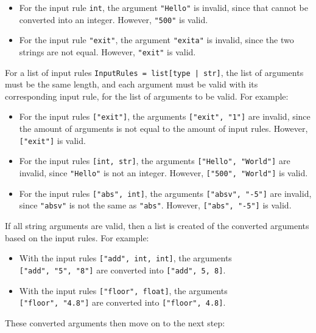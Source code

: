 \documentclass{article}
\begin{document}
				\begin{itemize}
					\item For the input rule \verb|int|, the argument \verb|"Hello"| is invalid,
					since that cannot be converted into an integer. However, \verb|"500"| is
					valid.
					\item For the input rule \verb|"exit"|, the argument \verb|"exita"| is invalid,
					since the two strings are not equal. However, \verb|"exit"| is valid.
				\end{itemize}

				For a list of input rules \verb+InputRules = list[type | str]+, the list of
				arguments must be the same length, and each argument must be valid with its
				corresponding input rule, for the list of arguments to be valid. For example:

				\begin{itemize}
					\item For the input rules \verb|["exit"]|, the arguments \verb|["exit", "1"]| are
					invalid, since the amount of arguments is not equal to the amount of input rules.
					However, \verb|["exit"]| is valid.
					\item For the input rules \verb|[int, str]|, the arguments \verb|["Hello", "World"]|
					are invalid, since \verb|"Hello"| is not an integer. However, \verb|["500", "World"]|
					is valid.
					\item For the input rules \verb|["abs", int]|, the arguments \verb|["absv", "-5"]|
					are invalid, since \verb|"absv"| is not the same as \verb|"abs"|. However,
					\verb|["abs", "-5"]| is valid.
				\end{itemize}

				If all string arguments are valid, then a list is created of the converted arguments based
				on the input rules. For example:

				\begin{itemize}
					\item With the input rules \verb|["add", int, int]|, the arguments \\
					\verb|["add", "5", "8"]| are converted into \verb|["add", 5, 8]|.
					\item With the input rules \verb|["floor", float]|, the arguments \\
					\verb|["floor", "4.8"]| are converted into \verb|["floor", 4.8]|.
				\end{itemize}

				These converted arguments then move on to the next step:
\end{document}
